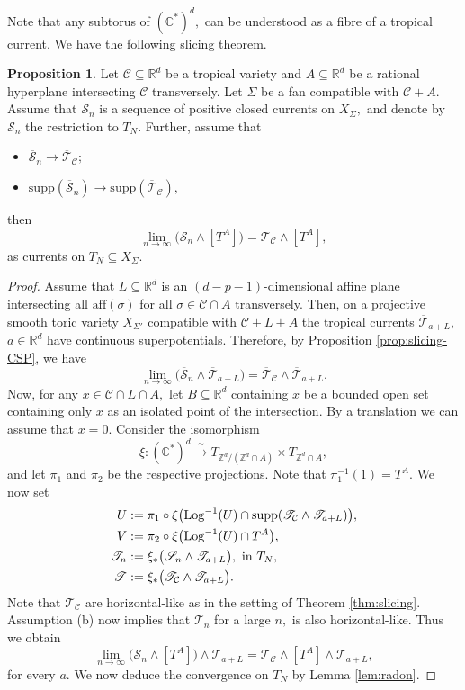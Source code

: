\documentclass[11pt]{amsart}
\def\Log{{\rm Log}}
\theoremstyle{definition}
\newtheorem{proposition}[theorem]{Proposition}
\newcommand{\R}{\mathbb{R}}
\newcommand{\Z}{\mathbb{Z}}
\newcommand{\lto}{\longrightarrow}
\newcommand{\C}{\mathbb{C}}
\newcommand{\cC}{\mathcal{C}}
\newcommand{\sT}{\mathscr{T}}
\newcommand{\sS}{\mathscr{S}}
\newcommand{\supp}[1]{{\mathrm{supp}(#1)}}
\begin{document}
Note that any subtorus of $(\C^*)^d,$ can be understood as a fibre of a tropical current. We have the following slicing theorem. 
\begin{proposition}\label{prop:slicing}
    Let $\cC \subseteq \R^d$ be a tropical variety and $A\subseteq \R^d$ be a rational hyperplane intersecting $\cC$ transversely. Let $\Sigma$ be a fan compatible with $\cC+ A.$ Assume that ${\overline{\sS}_n}$ is a sequence of positive closed currents on $X_{\Sigma},$ and denote by $\sS_n$ the restriction to $T_N.$ Further, assume that 
\begin{itemize}
\item [(a)] $\overline{\sS}_n \lto \overline{\sT}_{\cC};$
\item [(b)] $\supp{\overline{\sS}_n}  \lto \supp{\overline{\sT}_{\cC}},$
\end{itemize}
then
$$
\lim_{n\to \infty} \big({\sS_n} \wedge [T^A] \big) = \sT_{\cC} \wedge [T^A],
$$
as currents on $T_N \subseteq X_{\Sigma}.$
\end{proposition}

\begin{proof}
Assume that $L\subseteq \R^d$ is an $(d-p-1)$-dimensional affine plane intersecting all $\text{aff}(\sigma)$ for all $\sigma \in \cC \cap A$ transversely. Then, on a projective smooth toric variety $X_{\Sigma'}$ compatible with $\cC+L+ A$ the tropical currents $\overline{\sT}_{a + L},$ $a\in \R^d$ have continuous superpotentials. Therefore, by Proposition \ref{prop:slicing-CSP}, we have
$$
\lim_{n\to \infty} \big(\overline{\sS}_n \wedge \overline{\sT}_{a+L} \big) =  \overline{ \sT}_{\cC}  \wedge \overline{\sT}_{a+L}.
$$
Now, for any $x \in \cC \cap L \cap A,$ let $B\subseteq \R^d$ containing $x$ be a bounded open set containing only $x$ as an isolated point of the intersection. By a translation we can assume that $x=0.$ Consider the isomorphism
$$\xi: (\C^*)^d \xrightarrow{~\sim~} T_{\Z^d /(\Z^d \cap A)} \times T_{\Z^d \cap A},$$ 
and let $\pi_1$ and $\pi_2$ be the respective projections. Note that $\pi_1^{-1}(1) = T^A.$ We now set
\begin{align*}
    U &:= \pi_1\circ\xi\big( \Log^{-1}(U) \cap \supp{\sT_{\cC} \wedge \sT_{a+L}} \big),\\
    V &:=  \pi_2 \circ \xi\big( \Log^{-1}(U) \cap  T^A \big), \\
    \sT_n &:= \xi_* \big(\sS_n \wedge \sT_{a+L} \big), \text{ in $T_N$}, \\
    \sT &:= \xi_* \big( \sT_{\cC}  \wedge \sT_{a+L}\big).
\end{align*}
Note that $\sT_{\cC}$ are horizontal-like as in the setting of Theorem \ref{thm:slicing}.  Assumption (b) now implies that  $\sT_n$ for a large $n,$ is also horizontal-like. Thus we obtain
$$ 
\lim_{n\to \infty} \big(\sS_n  \wedge [T^A] \big)\wedge \sT_{a+L}= \sT_{\cC} \wedge [T^A] \wedge \sT_{a+L},
$$
for every $a.$ We now deduce the convergence on $T_N$ by Lemma \ref{lem:radon}. 
\end{proof}
\end{document}
